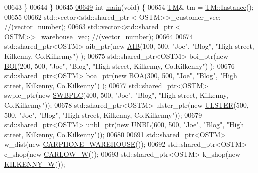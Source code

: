 \begin{DoxyCode}
00643     \}
00644 \}
00645 
\hypertarget{main_8cpp_source.tex_l00649}{}\hyperlink{main_8cpp_a840291bc02cba5474a4cb46a9b9566fe_a840291bc02cba5474a4cb46a9b9566fe}{00649} \textcolor{keywordtype}{int} \hyperlink{main_8cpp_a840291bc02cba5474a4cb46a9b9566fe_a840291bc02cba5474a4cb46a9b9566fe}{main}(\textcolor{keywordtype}{void}) \{
00654     \hyperlink{class_t_m}{TM}& tm = \hyperlink{class_t_m_a7ce5f35e0dae76df4fe116cf905bbe60_a7ce5f35e0dae76df4fe116cf905bbe60}{TM::Instance}();
00655 
00662     std::vector<std::shared\_ptr < OSTM>>\_customer\_vec; \textcolor{comment}{//(vector\_number);}
00663     std::vector<std::shared\_ptr < OSTM>>\_warehouse\_vec; \textcolor{comment}{//(vector\_number);}
00664 
00674     std::shared\_ptr<OSTM> aib\_ptr(\textcolor{keyword}{new} \hyperlink{class_a_i_b}{AIB}(100, 500, \textcolor{stringliteral}{"Joe"}, \textcolor{stringliteral}{"Blog"}, \textcolor{stringliteral}{"High street, Kilkenny, Co.Kilkenny"})
      );
00675     std::shared\_ptr<OSTM> boi\_ptr(\textcolor{keyword}{new} \hyperlink{class_b_o_i}{BOI}(200, 500, \textcolor{stringliteral}{"Joe"}, \textcolor{stringliteral}{"Blog"}, \textcolor{stringliteral}{"High street, Kilkenny, Co.Kilkenny"})
      );
00676     std::shared\_ptr<OSTM> boa\_ptr(\textcolor{keyword}{new} \hyperlink{class_b_o_a}{BOA}(300, 500, \textcolor{stringliteral}{"Joe"}, \textcolor{stringliteral}{"Blog"}, \textcolor{stringliteral}{"High street, Kilkenny, Co.Kilkenny"})
      );
00677     std::shared\_ptr<OSTM> swplc\_ptr(\textcolor{keyword}{new} \hyperlink{class_s_w_b_p_l_c}{SWBPLC}(400, 500, \textcolor{stringliteral}{"Joe"}, \textcolor{stringliteral}{"Blog"}, \textcolor{stringliteral}{"High street, Kilkenny,
       Co.Kilkenny"}));
00678     std::shared\_ptr<OSTM> ulster\_ptr(\textcolor{keyword}{new} \hyperlink{class_u_l_s_t_e_r}{ULSTER}(500, 500, \textcolor{stringliteral}{"Joe"}, \textcolor{stringliteral}{"Blog"}, \textcolor{stringliteral}{"High street, Kilkenny,
       Co.Kilkenny"}));
00679     std::shared\_ptr<OSTM> unbl\_ptr(\textcolor{keyword}{new} \hyperlink{class_u_n_b_l}{UNBL}(600, 500, \textcolor{stringliteral}{"Joe"}, \textcolor{stringliteral}{"Blog"}, \textcolor{stringliteral}{"High street, Kilkenny,
       Co.Kilkenny"}));
00680 
00691     std::shared\_ptr<OSTM> w\_dist(\textcolor{keyword}{new} \hyperlink{class_c_a_r_p_h_o_n_e___w_a_r_e_h_o_u_s_e}{CARPHONE\_WAREHOUSE}());
00692     std::shared\_ptr<OSTM> c\_shop(\textcolor{keyword}{new} \hyperlink{class_c_a_r_l_o_w___w}{CARLOW\_W}());
00693     std::shared\_ptr<OSTM> k\_shop(\textcolor{keyword}{new} \hyperlink{class_k_i_l_k_e_n_n_y___w}{KILKENNY\_W}());

\end{DoxyCode}
